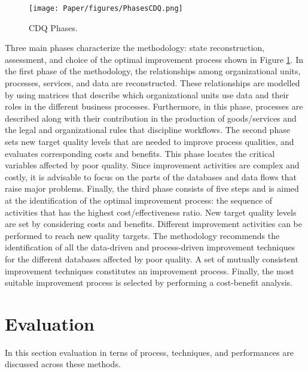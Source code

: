 \documentclass[pdftex,english,oribibl]{llncs}
\begin{document}
\begin{figure}
    \centering
    \texttt{[image: Paper/figures/PhasesCDQ.png]}
    \caption{CDQ Phases.}
    \label{fig:PhasesCDQ}
 \end{figure}

Three main phases characterize the methodology: state reconstruction, assessment, and choice of the optimal improvement process shown in Figure \ref{fig:PhasesCDQ}.
In the first phase of the methodology, the relationships among organizational units, processes, services, and data are reconstructed.
These relationships are modelled by using matrices that describe which organizational units use data and their roles in the different business processes.
Furthermore, in this phase, processes are described along with their contribution in the production of goods/services and the legal and organizational rules that discipline workflows.
The second phase sets new target quality levels that are needed to improve process qualities, and evaluates corresponding costs and benefits.
This phase locates the critical variables affected by poor quality. Since improvement activities are complex and costly, it is advisable to focus on the parts of the databases and data flows that raise major problems.
Finally, the third phase consists of five steps and is aimed at the identification of the optimal improvement process: the sequence of activities that has the highest cost/effectiveness ratio.
New target quality levels are set by considering costs and benefits. Different improvement activities can be performed to reach new quality targets.
The methodology recommends the identification of all the data-driven and process-driven improvement techniques for the different databases affected by poor quality.
A set of mutually consistent improvement techniques constitutes an improvement process.
Finally, the most suitable improvement process is selected by performing a cost-benefit analysis.


\section{Evaluation}
In this section evaluation in terns of process, techniques, and performances are discussed across these methods.
\end{document}
